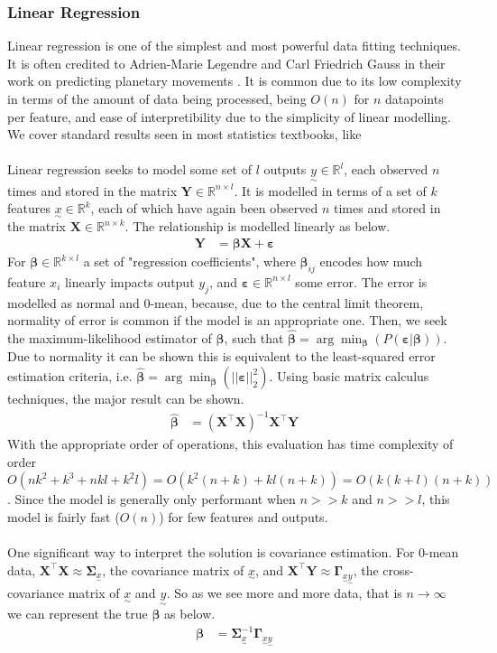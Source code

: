 \documentclass[12pt,a4paper]{article} %
\newcommand{\ve}[1]{\underset{\sim}{#1}}
\begin{document}
\subsubsection{Linear Regression}
\label{subsec:linear_reg}
Linear regression is one of the simplest and most powerful data fitting techniques. It is often credited to Adrien-Marie Legendre and Carl Friedrich Gauss in their work on predicting planetary movements \cite{linear}. It is common due to its low complexity in terms of the amount of data being processed, being $O(n)$ for $n$ datapoints per feature, and ease of interpretibility due to the simplicity of linear modelling. We cover standard results seen in most statistics textbooks, like \cite{stats}\\\\
Linear regression seeks to model some set of $l$ outputs $\ve{y}\in\mathbb{R}^l$, each observed $n$ times and stored in the matrix $\pmb{Y}\in\mathbb{R}^{n\times l}$. It is modelled in terms of a set of $k$ features $\ve{x}\in\mathbb{R}^k$, each of which have again been observed $n$ times and stored in the matrix $\pmb{X}\in\mathbb{R}^{n\times k}$. The relationship is modelled linearly as below.
\begin{align*}
    \pmb{Y}&=\pmb{\beta X} + \pmb{\varepsilon}
\end{align*}
For $\pmb{\beta}\in\mathbb{R}^{k\times l}$ a set of "regression coefficients", where $\pmb{\beta}_{ij}$ encodes how much feature $x_i$ linearly impacts output $y_j$, and $\pmb{\varepsilon}\in\mathbb{R}^{n\times l}$ some error. The error is modelled as normal and 0-mean, because, due to the central limit theorem, normality of error is common if the model is an appropriate one. Then, we seek the maximum-likelihood estimator of $\pmb{\beta}$, such that $\pmb{\hat{\beta}}=\arg\min_{\pmb{\beta}}(P(\pmb{\varepsilon}|\pmb{\beta}))$. Due to normality it can be shown this is equivalent to the least-squared error estimation criteria, i.e. $\pmb{\hat{\beta}}=\arg\min_{\pmb{\beta}}(||\pmb{\varepsilon}||_2^2)$. Using basic matrix calculus techniques, the major result can be shown.
\begin{align*}
    \pmb{\hat{\beta}}&=(\pmb{X}^\top\pmb{X})^{-1}\pmb{X}^\top \pmb{Y}
\end{align*}
With the appropriate order of operations, this evaluation has time complexity of order $O(nk^2+k^3+nkl+k^2l)=O(k^2(n+k)+kl(n+k))=O(k(k+l)(n+k))$. Since the model is generally only performant when $n>>k$ and $n>>l$, this model is fairly fast ($O(n)$) for few features and outputs.\\\\
One significant way to interpret the solution is covariance estimation. For 0-mean data, $\pmb{X}^\top\pmb{X}\approx \pmb{\Sigma}_{\ve{x}}$, the covariance matrix of $\ve{x}$, and $\pmb{X}^\top\pmb{Y}\approx\pmb{\Gamma}_{\ve{x}\ve{y}}$, the cross-covariance matrix of $\ve{x}$ and $\ve{y}$. So as we see more and more data, that is $n\to\infty$ we can represent the true $\pmb{\beta}$ as below.
\begin{align*}
    \pmb{\beta}&=\pmb{\Sigma}_{\ve{x}}^{-1}\pmb{\Gamma}_{\ve{x}\ve{y}}
\end{align*}
\end{document}
